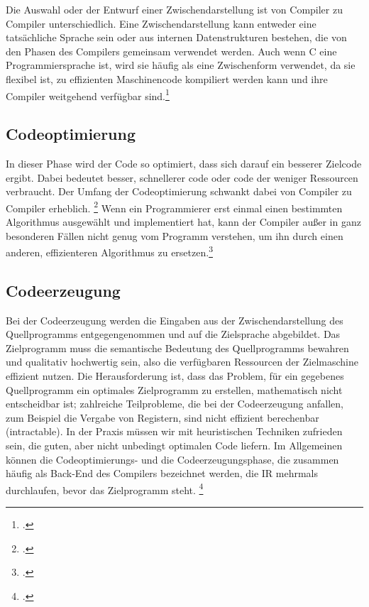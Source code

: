 Die Auswahl oder der Entwurf einer Zwischendarstellung ist von Compiler zu Compiler  unterschiedlich.  Eine Zwischendarstellung kann entweder eine tatsächliche Sprache  sein oder aus internen Datenstrukturen bestehen, die von den Phasen des Compilers gemeinsam verwendet werden. Auch wenn C eine Programmiersprache ist, wird sie häufig  als eine Zwischenform verwendet, da sie flexibel ist, zu effizienten Maschinencode kompiliert werden kann und ihre Compiler weitgehend verfügbar sind.\footcite[Vgl.][S. 433]{Ullmann2008}


\subsection{Codeoptimierung}
In dieser Phase wird der Code so optimiert, dass sich darauf ein besserer Zielcode ergibt.  Dabei bedeutet besser, schnellerer code oder code der weniger Ressourcen verbraucht.  Der Umfang der Codeoptimierung schwankt dabei von Compiler zu Compiler erheblich.  \footcite[Vgl.][S. 11f]{Ullmann2008} Wenn ein Programmierer erst einmal einen bestimmten Algorithmus ausgewählt  und implementiert hat, kann der Compiler außer in ganz besonderen Fällen nicht genug  vom Programm verstehen, um ihn durch einen anderen, effizienteren Algorithmus zu  ersetzen.\footcite[Vgl.][S. 712]{Ullmann2008}

\subsection{Codeerzeugung}
Bei der Codeerzeugung werden die Eingaben aus der Zwischendarstellung des Quellprogramms entgegengenommen und auf die Zielsprache abgebildet. Das Zielprogramm  muss die semantische Bedeutung des Quellprogramms bewahren und qualitativ hochwertig sein, also die verfügbaren Ressourcen der Zielmaschine effizient nutzen.  Die Herausforderung ist, dass das Problem, für ein gegebenes Quellprogramm ein optimales Zielprogramm zu erstellen, mathematisch nicht entscheidbar ist; zahlreiche  Teilprobleme, die bei der Codeerzeugung anfallen, zum Beispiel die Vergabe von Registern, sind nicht effizient berechenbar (intractable). In der Praxis müssen wir mit heuristischen Techniken zufrieden sein, die guten, aber nicht unbedingt optimalen Code liefern.  Im Allgemeinen können die  Codeoptimierungs- und die Codeerzeugungsphase, die zusammen häufig als Back-End  des Compilers bezeichnet werden, die IR mehrmals durchlaufen, bevor das Zielprogramm steht. \footcite[Vgl.][S. 618f]{Ullmann2008}

